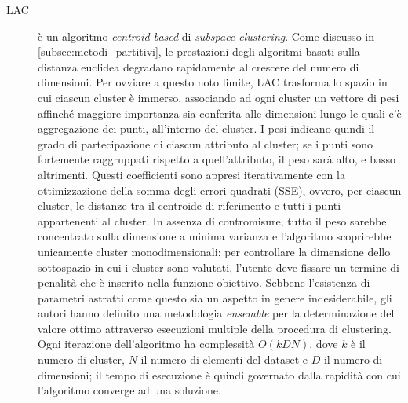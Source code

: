 \begin{description}
\item[LAC] \`e un algoritmo \textit{centroid-based} di \textit{subspace clustering}. Come discusso in \ref{subsec:metodi_partitivi}, le prestazioni degli algoritmi basati sulla distanza euclidea degradano rapidamente al crescere del numero di dimensioni. Per ovviare a questo noto limite, LAC trasforma lo spazio in cui ciascun cluster \`e immerso, associando ad ogni cluster un vettore di pesi affinch\'e maggiore importanza sia conferita alle dimensioni lungo le quali c'\`e aggregazione dei punti, all'interno del cluster. I pesi indicano quindi il grado di partecipazione di ciascun attributo al cluster; se i punti sono fortemente raggruppati rispetto a quell'attributo, il peso sar\`a alto, e basso altrimenti. Questi coefficienti sono appresi iterativamente con la ottimizzazione della somma degli errori quadrati (SSE), ovvero, per ciascun cluster, le distanze tra il centroide di riferimento e tutti i punti appartenenti al cluster. In assenza di contromisure, tutto il peso sarebbe concentrato sulla dimensione a minima varianza e l'algoritmo scoprirebbe unicamente cluster monodimensionali; per controllare la dimensione dello sottospazio in cui i cluster sono valutati, l'utente deve fissare un termine di penalit\`a che \`e inserito nella funzione obiettivo. Sebbene l'esistenza di parametri astratti come questo sia un aspetto in genere indesiderabile, gli autori hanno definito una metodologia \textit{ensemble} per la determinazione del valore ottimo attraverso esecuzioni multiple della procedura di clustering. Ogni iterazione dell'algoritmo ha complessit\`a $O(kDN)$, dove $k$ \`e il numero di cluster, $N$ il numero di elementi del dataset e $D$ il numero di dimensioni; il tempo di esecuzione \`e quindi governato dalla rapidit\`a con cui l'algoritmo converge ad una soluzione.

\end{description}
